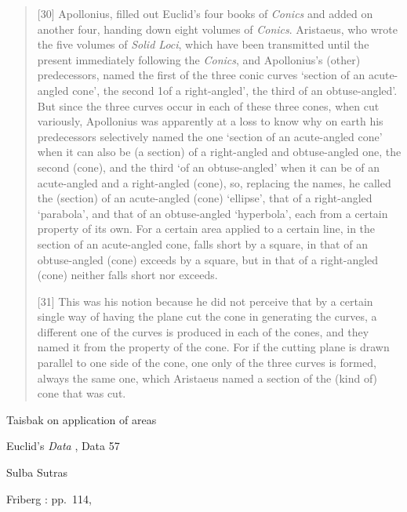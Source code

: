 \documentclass{article}
\begin{document}
\begin{quote}
[30] Apollonius, filled out Euclid's four books of {\em Conics} and added on another four, handing down eight volumes of {\em Conics}. Aristaeus, who wrote the five volumes of
{\em Solid Loci}, which have been transmitted until the present immediately following the {\em Conics}, and Apollonius's (other) predecessors, named the first of the three conic curves `section of an acute-angled cone', the second 1of a right-angled', the third of an obtuse-angled'. But since the three curves occur in each of these three cones, when cut
 variously, Apollonius was apparently at a loss to know why on earth his predecessors selectively named the one `section of an acute-angled cone' when it can also
 be (a section) of a right-angled and obtuse-angled one, the second (cone), and the third `of an obtuse-angled' when it can be of an
 acute-angled and a right-angled (cone), so, replacing the names, he called the (section) of an acute-angled (cone) `ellipse', that of a right-angled `parabola', and that of an
 obtuse-angled `hyperbola', each from a certain property of its own. For a certain area applied to a certain line, in the section of an acute-angled cone, falls short by a square, in that of an obtuse-angled (cone) exceeds by a square, but in that of a right-angled (cone) neither falls short nor exceeds.
 
 [31] This was his notion because he did not perceive that by a certain single way of having the plane cut the cone in generating the curves, a different one of the curves is produced in each of the cones, and they named it from the property of the cone. For if the cutting plane is drawn parallel to one side of the cone, one only of the three curves is formed, always the same one, which Aristaeus named a section of the (kind of) cone that was cut.
\end{quote}

Taisbak on application of areas \cite{taisbak2003}

Euclid's {\em Data} \cite{data}, Data 57

Sulba Sutras


Friberg \cite{amazing}: pp.~114, 




\end{document}
